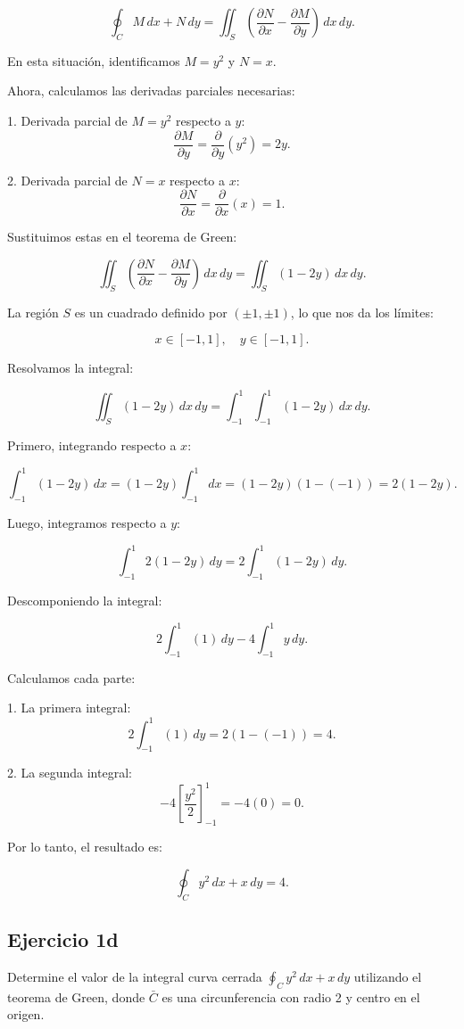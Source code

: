 \documentclass{report}
\begin{document}
\[
\oint_C M \, dx + N \, dy = \iint_S \left( \frac{\partial N}{\partial x} - \frac{\partial M}{\partial y} \right) \, dx \, dy.
\]

En esta situación, identificamos \(M = y^2\) y \(N = x\).

Ahora, calculamos las derivadas parciales necesarias:

1. Derivada parcial de \(M = y^2\) respecto a \(y\):
\[
\frac{\partial M}{\partial y} = \frac{\partial}{\partial y}(y^2) = 2y.
\]

2. Derivada parcial de \(N = x\) respecto a \(x\):
\[
\frac{\partial N}{\partial x} = \frac{\partial}{\partial x}(x) = 1.
\]

Sustituimos estas en el teorema de Green:

\[
\iint_S \left( \frac{\partial N}{\partial x} - \frac{\partial M}{\partial y} \right) \, dx \, dy = \iint_S (1 - 2y) \, dx \, dy.
\]

La región \(S\) es un cuadrado definido por \((\pm 1, \pm 1)\), lo que nos da los límites:

\[
x \in [-1, 1], \quad y \in [-1, 1].
\]

Resolvamos la integral:

\[
\iint_S (1 - 2y) \, dx \, dy = \int_{-1}^1 \int_{-1}^1 (1 - 2y) \, dx \, dy.
\]

Primero, integrando respecto a \(x\):

\[
\int_{-1}^1 (1 - 2y) \, dx = (1 - 2y) \int_{-1}^1 dx = (1 - 2y)(1 - (-1)) = 2(1 - 2y).
\]

Luego, integramos respecto a \(y\):

\[
\int_{-1}^1 2(1 - 2y) \, dy = 2 \int_{-1}^1 (1 - 2y) \, dy.
\]

Descomponiendo la integral:

\[
2 \int_{-1}^1 (1) \, dy - 4 \int_{-1}^1 y \, dy.
\]

Calculamos cada parte:

1. La primera integral:
\[
2 \int_{-1}^1 (1) \, dy = 2(1 - (-1)) = 4.
\]

2. La segunda integral:
\[
-4 \left[\frac{y^2}{2}\right]_{-1}^1 = -4(0) = 0.
\]

Por lo tanto, el resultado es:

\[
\oint_C y^2 \, dx + x \, dy = 4.
\]

\subsection*{Ejercicio 1d}
Determine el valor de la integral curva cerrada $\oint_C y^2 \, dx + x \, dy$ utilizando el teorema de Green, donde $\bar{C}$ es una circunferencia con radio 2 y centro en el origen.
\end{document}
